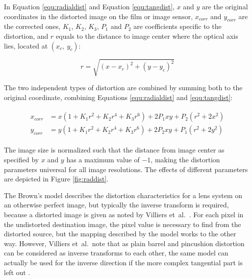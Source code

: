In Equation \ref{equ:radialdist} and Equation \ref{equ:tangdist}, $x$ and $y$ are the original coordinates in the distorted image on the film or image sensor, $x_{corr}$ and $y_{corr}$ are the corrected ones, $K_1$, $K_2$, $K_3$, $P_1$ and $P_2$ are coefficients specific to the distortion, and $r$ equals to the distance to image center where the optical axis lies, located at $(x_c,~y_c)$:

\begin{equation}
r = \sqrt{(x - x_c)^2 + (y - y_c)^2}
\end{equation}

The two independent types of distortion are combined by summing both to the original coordinate, combining Equations \ref{equ:radialdist} and \ref{equ:tangdist}:

\begin{align} \label{equ:bothdist} \begin{split}
	x_{corr} &= x (1 + K_1 r^2 + K_2 r^4 + K_3 r^6) + 2 P_1 x y + P_2 (r^2 + 2 x^2)\\
	y_{corr} &= y (1 + K_1 r^2 + K_2 r^4 + K_3 r^6) + 2 P_2 x y + P_1 (r^2 + 2 y^2)
\end{split} \end{align}

The image size is normalized such that the distance from image center as specified by $x$ and $y$ has a maximum value of $-1$, making the distortion parameters universal for all image resolutions.
The effects of different parameters are depicted in Figure \ref{fig:raddist}.


The Brown's model describes the distortion characteristics for a lens system on an otherwise perfect image, but typically the inverse transform is required, because a distorted image is given as noted by Villiers et~al.\ \cite{villiers2008centi}. %
For each pixel in the undistorted destination image, the pixel value is necessary to find from the distorted source, but the mapping described by the model works to the other way.
However, Villiers et~al.\ note that as plain barrel and pincushion distortion can be considered as inverse transforms to each other, the same model can actually be used for the inverse direction if the more complex tangential part is left out \cite{villiers2008centi}.

